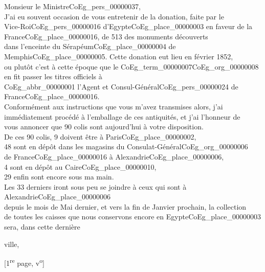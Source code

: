 \documentclass{book}
\begin{document}
\hspace{1cm} Monsieur le Ministre\gls{CoEg_pers_00000037},\\

\indent J’ai eu souvent occasion de vous entretenir de la donation, faite par le\\
Vice-Roi\gls{CoEg_pers_00000016} d’Egypte\gls{CoEg_place_00000003} en faveur de la France\gls{CoEg_place_00000016}, de 513 des monuments découverts\\
dans l’enceinte du Sérapéum\gls{CoEg_place_00000004} de Memphis\gls{CoEg_place_00000005}. Cette donation eut lieu en février 1852,\\
ou plutôt c’est à cette époque que le \Gls{CoEg_term_00000007}\gls{CoEg_org_00000008} en fit passer les titres officiels à\\
\gls{CoEg_abbr_00000001} l’Agent et Consul-Général\gls{CoEg_pers_00000024} de France\gls{CoEg_place_00000016}.\\
\indent Conformément aux instructions que vous m’avez transmises alors, j’ai\\
immédiatement procédé à l’emballage de ces antiquités, et j’ai l’honneur de\\
vous annoncer que 90 colis sont aujourd’hui à votre disposition.\\
\indent De ces 90 colis, 9 doivent être à Paris\gls{CoEg_place_00000002},\\
\indent \hspace{2cm}48 sont en dépôt dans les magasins du Consulat-Général\gls{CoEg_org_00000006}\\
\indent \hspace{3cm} de France\gls{CoEg_place_00000016} à Alexandrie\gls{CoEg_place_00000006},\\
\indent \hspace{2cm} 4 sont en dépôt au Caire\gls{CoEg_place_00000010},\\
\indent \hspace{2cm} 29 enfin sont encore sous ma main.\\
\indent Les 33 derniers iront sous peu se joindre à ceux qui sont à Alexandrie\gls{CoEg_place_00000006}\\
depuis le mois de Mai dernier, et vers la fin de Janvier prochain, la collection\\
de toutes les caisses que nous conservons encore en Egypte\gls{CoEg_place_00000003} sera, dans cette dernière
\begin{flushright}ville,\end{flushright}
{\footnotesize\begin{center} {[1\textsuperscript{re} page, v\textsuperscript{o}]}\end{center}}
\end{document}
